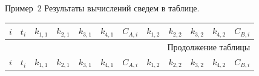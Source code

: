 \documentclass[aspectratio=169, mathserif]{beamer}	%
\begin{document}
\begin{frame}[fragile, ]{Пример~2}
\scriptsize
Результаты вычислений сведем в таблице.
\vfill
{}
\renewcommand{\arraystretch}{1.5}
\begin{longtable}{|r|r|r|r|r|r|r|r|r|r|r|r|}
	\hline
	\multicolumn{1}{|r|}{$i$} & \multicolumn{1}{r|}{$t_i$} & \multicolumn{1}{r|}{$k_{1,1}$} & \multicolumn{1}{r|}{$k_{2,1}$} & \multicolumn{1}{r|}{$k_{3,1}$} & \multicolumn{1}{r|}{$k_{4,1}$} & \multicolumn{1}{r|}{$C_{A,i}$} & \multicolumn{1}{r|}{$k_{1,2}$} & \multicolumn{1}{r|}{$k_{2,2}$} & \multicolumn{1}{r|}{$k_{3,2}$} & \multicolumn{1}{r|}{$k_{4,2}$} & \multicolumn{1}{r|}{$C_{B,i}$}  \\
	\hline
	\endfirsthead

	\multicolumn{12}{r}{Продолжение таблицы \thetable{}} \\
	\hline
	\multicolumn{1}{|r|}{$i$} & \multicolumn{1}{r|}{$t_i$} & \multicolumn{1}{r|}{$k_{1,1}$} & \multicolumn{1}{r|}{$k_{2,1}$} & \multicolumn{1}{r|}{$k_{3,1}$} & \multicolumn{1}{r|}{$k_{4,1}$} & \multicolumn{1}{r|}{$C_{A,i}$} & \multicolumn{1}{r|}{$k_{1,2}$} & \multicolumn{1}{r|}{$k_{2,2}$} & \multicolumn{1}{r|}{$k_{3,2}$} & \multicolumn{1}{r|}{$k_{4,2}$} & \multicolumn{1}{r|}{$C_{B,i}$}  \\
	\hline
	\endhead


\end{longtable}
\end{frame}
\end{document}
